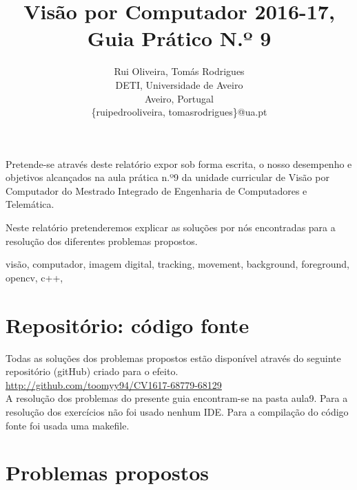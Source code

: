 \documentclass[portuguese, times, mirror]{revdetua}
\begin{document}

\title{Visão por Computador 2016-17, Guia Prático N.º 9}
\author{Rui Oliveira, Tomás Rodrigues\\ DETI, Universidade de Aveiro \\ Aveiro, Portugal \\ \{ruipedrooliveira, tomasrodrigues\}@ua.pt}
\maketitle

\begin{resumo}


Pretende-se através deste relatório expor sob forma escrita, o nosso desempenho e objetivos alcançados na aula prática n.º9 da unidade curricular de Visão por Computador do Mestrado Integrado de Engenharia de Computadores e Telemática.

Neste relatório pretenderemos explicar as soluções por nós encontradas para a resolução dos diferentes problemas propostos.


\end{resumo} 

\begin{palavraschave} %
visão, computador, imagem digital, tracking, movement, background, foreground, opencv, c++, 
 \end{palavraschave} %


\section{Repositório: código fonte}


Todas as soluções dos problemas propostos estão disponível através do seguinte repositório (gitHub) criado para o efeito. \\

\href{http://github.com/toomyy94/CV1617-68779-68129}{http://github.com/toomyy94/CV1617-68779-68129}
\\


A resolução dos problemas do presente guia encontram-se na pasta aula9. Para a resolução dos exercícios não foi usado nenhum IDE. Para a compilação do código fonte foi usada uma makefile. 



\section{Problemas propostos}
\end{document}
